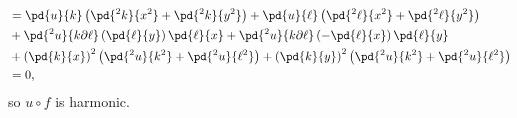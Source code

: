 \documentclass[10pt]{mypackage}
\begin{document}
\begin{solution}
\begin{align*}
                                  &= \pd{u}{k}\left( \pd{^2k}{x^2} + \pd{^2k}{y^2} \right) + \pd{u}{\ell}\left( \pd{^2\ell}{x^2} + \pd{^2\ell}{y^2} \right)\\
                                  &+ \pd{^2u}{k\partial \ell} \left( \pd{\ell}{y} \right)\pd{\ell}{x} + \pd{^2u}{k\partial \ell} \left( - \pd{\ell}{x} \right) \pd{\ell}{y}\\
                                  &+ \left( \pd{k}{x} \right)^2\left( \pd{^2u}{k^2}+ \pd{^2u}{\ell^2} \right) + \left( \pd{k}{y} \right)^2 \left( \pd{^2u}{k^2} + \pd{^2u}{\ell^2} \right)\\
                                  &= 0,
  \end{align*}
  so $u\circ f$ is harmonic.
\end{solution}
\end{document}
